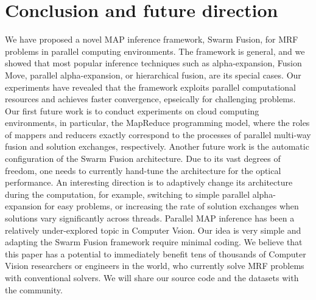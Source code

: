 \section{Conclusion and future direction}
We have proposed a novel MAP inference framework, Swarm Fusion, for MRF
problems in parallel computing environments. The framework is general,
and we showed that most popular inference techniques such as
alpha-expansion, Fusion Move, parallel alpha-expansion, or hierarchical
fusion, are its special cases. Our experiments have revealed that the
framework exploits parallel computational resources and achieves faster
convergence, epseically for challenging problems.  Our first future work
is to conduct experiments on cloud computing environments, in
particular, the MapReduce programming model, where the roles of mappers
and reducers exactly correspond to the processes of parallel multi-way
fusion and solution exchanges, respectively.  Another future work is the
automatic configuration of the Swarm Fusion architecture. Due to its
vast degrees of freedom, one needs to currently hand-tune the
architecture for the optical performance. An interesting direction is to
adaptively change its architecture during the computation, for example,
switching to simple parallel alpha-expansion for easy problems, or
increasing the rate of solution exchanges when solutions vary
significantly across threads.
%
Parallel MAP inference has been a relatively under-explored topic in
Computer Vsion. Our idea is very simple and adapting the Swarm Fusion
framework require minimal coding. We believe that this paper has a
potential to immediately benefit tens of thousands of Computer Vision
researchers or engineers in the world, who currently solve MRF problems
with conventional solvers. We will share our source code and the
datasets with the community.
